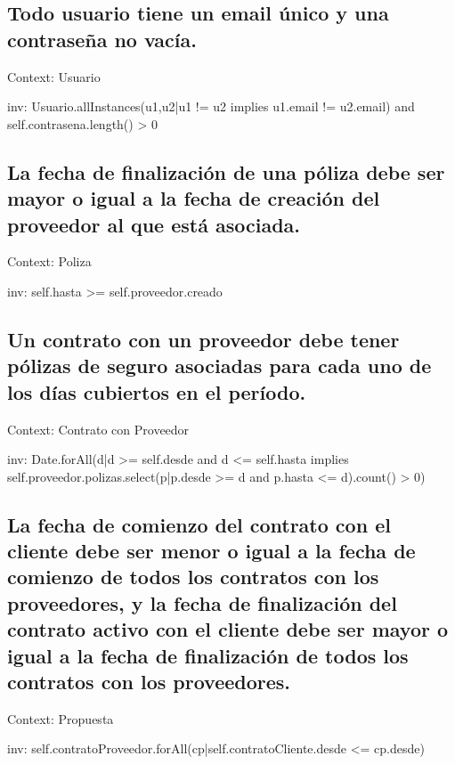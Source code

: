 \documentclass{article}
\theoremstyle{definition}
\theoremstyle{remark}
\begin{document}
\subsection*{Todo usuario tiene un email único y una contraseña no vacía.}

\begin{ocl}{}
Context: Usuario

inv:
Usuario.allInstances(u1,u2|u1 != u2 implies u1.email != u2.email) and self.contrasena.length() > 0
\end{ocl}

\subsection*{La fecha de finalización de una póliza debe ser mayor o igual a la fecha de creación del proveedor al que está asociada.}

\begin{ocl}{}
Context: Poliza

inv:
self.hasta >= self.proveedor.creado

\end{ocl}

\subsection*{Un contrato con un proveedor debe tener pólizas de seguro asociadas para cada uno de los días cubiertos en el período.}

\begin{ocl}{}
Context: Contrato con Proveedor

inv:
Date.forAll(d|d >= self.desde and d <= self.hasta implies self.proveedor.polizas.select(p|p.desde >= d and p.hasta <= d).count() > 0)

\end{ocl}

\subsection*{La fecha de comienzo del contrato con el cliente debe ser menor o igual a la fecha de comienzo de todos los contratos con los proveedores, y la fecha de finalización del contrato activo con el cliente debe ser mayor o igual a la fecha de finalización de todos los contratos con los proveedores.}

\begin{ocl}{}
Context: Propuesta

inv:
self.contratoProveedor.forAll(cp|self.contratoCliente.desde <= cp.desde)

\end{ocl}
\end{document}
